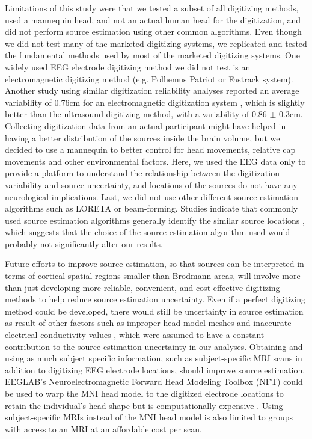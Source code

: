 \documentclass{UCF_ETD}
\renewcommand{\ul}{}
\begin{document}
Limitations of this study were that we tested a subset of all digitizing methods, \ul{used a mannequin head, and not an actual human head for the digitization}, and did not perform source estimation using other common algorithms. Even though we did not test many of the marketed digitizing systems, we replicated and tested the fundamental methods used by most of the marketed digitizing systems. One widely used EEG electrode digitizing method we did not test is an electromagnetic digitizing method (e.g. Polhemus Patriot or Fastrack system). Another study using similar digitization reliability analyses reported an average variability of 0.76cm for an electromagnetic digitization system \citep{Clausner2017-hv}, which is slightly better than the ultrasound digitizing method, with a variability of 0.86 $\pm$ 0.3cm. \ul{Collecting digitization data from an actual participant might have helped in having a better distribution of the sources inside the brain volume, but we decided to use a mannequin to better control for head movements, relative cap movements and other environmental factors. Here, we used the EEG data only to provide a platform to understand the relationship between the digitization variability and source uncertainty, and locations of the sources do not have any neurological implications}. Last, we did not use other different source estimation algorithms such as LORETA or beam-forming. Studies indicate that commonly used source estimation algorithms generally identify the similar source locations \citep{Mahjoory2017-jv,Bradley2016-sk,Song2015-fv}, which suggests that the choice of the source estimation algorithm used would probably not significantly alter our results. 

Future efforts to improve source estimation, so that sources can be interpreted in terms of cortical spatial regions smaller than Brodmann areas, will involve more than just developing more reliable, convenient, and cost-effective digitizing methods to help reduce source estimation uncertainty. Even if a perfect digitizing method could be developed, there would still be uncertainty in source estimation as result of other factors such as improper head-model meshes and inaccurate electrical conductivity values \citep{Beltrachini2019-lf, Akalin_Acar2016-jr}, which were assumed to have a constant contribution to the source estimation uncertainty in our analyses. Obtaining and using as much subject specific information, such as subject-specific MRI scans in addition to digitizing EEG electrode locations, should improve source estimation. EEGLAB's Neuroelectromagnetic Forward Head Modeling Toolbox (NFT) could be used to warp the MNI head model to the digitized electrode locations to retain the individual's head shape but is computationally expensive \citep{Acar2010-ye}. Using subject-specific MRIs instead of the MNI head model is also limited to groups with access to an MRI at an affordable cost per scan.
\end{document}

